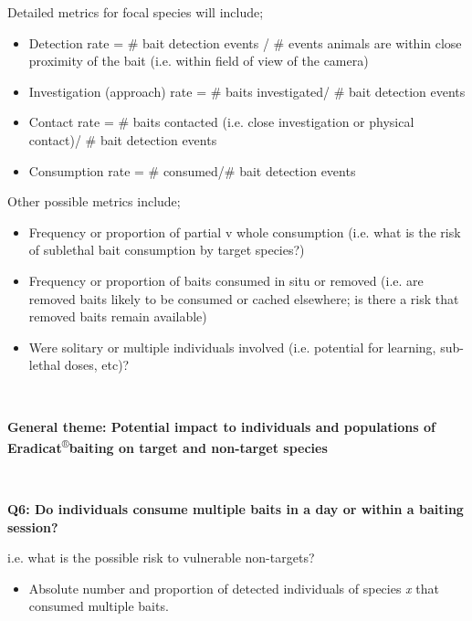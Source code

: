 \documentclass[version=last,
    paper=a4,                               %
    10pt,                                   %
    dvipsnames,
    oneside,                              %
    headings=openany,                       %
    open=any,
    BCOR=7mm,                               %
    DIV=15,     %
]{scrbook}
\begin{document}
Detailed metrics for focal species will include;

\begin{itemize}
\itemsep1pt\parskip0pt
\item
  Detection rate = \# bait detection events / \# events animals are
  within close proximity of the bait (i.e. within field of view of the
  camera)
\item
  Investigation (approach) rate = \# baits investigated/ \# bait
  detection events
\item
  Contact rate = \# baits contacted (i.e. close investigation or
  physical contact)/ \# bait detection events
\item
  Consumption rate = \# consumed/\# bait detection events
\end{itemize}

Other possible metrics include;

\begin{itemize}
\itemsep1pt\parskip0pt
\item
  Frequency or proportion of partial v whole consumption (i.e. what is
  the risk of sublethal bait consumption by target species?)
\end{itemize}

\begin{itemize}
\itemsep1pt\parskip0pt
\item
  Frequency or proportion of baits consumed in situ or removed (i.e. are
  removed baits likely to be consumed or cached elsewhere; is there a
  risk that removed baits remain available)
\item
  Were solitary or multiple individuals involved (i.e. potential for
  learning, sub-lethal doses, etc)?
\end{itemize}

~

\textbf{General theme: Potential impact to individuals and populations
of Eradicat}\textsuperscript{®}\textbf{baiting on target and non-target
species}

\textbf{~}

\textbf{Q6: Do individuals consume multiple baits in a day or within a
baiting session?}

i.e. what is the possible risk to vulnerable non-targets?

\begin{itemize}
\itemsep1pt\parskip0pt
\item
  Absolute number and proportion of detected individuals of species
  \emph{x} that consumed multiple baits.
\end{itemize}
\end{document}
